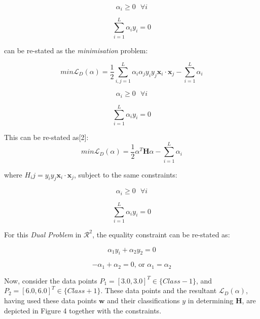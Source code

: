 \documentclass[10pt, a4paper,reqno]{amsart}
\begin{document}
\begin{equation}
\alpha_i\geq0\text{ }\forall{i}
\end{equation}

\begin{equation}
\sum_{i=1}^{L}\alpha_i y_i = 0
\end{equation}

can be re-stated as the \emph{minimisation} problem:

\begin{equation}
min\mathcal{L}_D(\alpha) = \frac{1}{2}\sum_{i,j=1}^{L}\alpha_i \alpha_j y_i y_j\mathbf{x}_i\cdot\mathbf{x}_j - \sum_{i=1}^{L}\alpha_i
\end{equation}

\begin{equation}
\alpha_i\geq0\text{ }\forall{i}
\end{equation}

\begin{equation}
\sum_{i=1}^{L}\alpha_i y_i = 0
\end{equation}

This can be re-stated as[2]:
\begin{equation}
min\mathcal{L}_D(\alpha) = \frac{1}{2}\alpha^T\mathbf{H}\alpha - \sum_{i=1}^{L}\alpha_i
\end{equation}

where $H_ij = y_i y_j \mathbf{x}_i\cdot\mathbf{x}_j$, subject to the same constraints:

\begin{equation}
\alpha_i\geq0\text{ }\forall{i}
\end{equation}

\begin{equation}
\sum_{i=1}^{L}\alpha_i y_i = 0
\end{equation}

For this \emph{Dual Problem} in $\mathcal{R}^2$, the equality constraint can be re-stated as:

\begin{equation}
\alpha_1 y_i + \alpha_2 y_2 = 0
\end{equation}

\begin{equation}
-\alpha_1 + \alpha_2 = 0\text{, or }\alpha_1 = \alpha_2
\end{equation}

Now, consider the data points $P_1 = [3.0, 3.0]^T \in \{Class -1\}$, and $P_2 = [6.0, 6.0]^T \in \{Class +1\}$. These data points and the resultant $\mathcal{L}_D(\alpha)$, having used these data points $\mathbf{w}$ and their classifications $y$ in determining $\mathbf{H}$, are depicted in Figure 4 together with the constraints.
\end{document}
